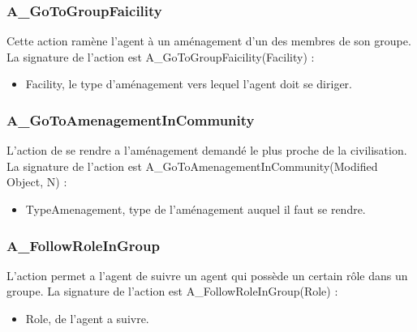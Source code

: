 	\subsubsection{A\_GoToGroupFaicility}

Cette action ramène l'agent à un aménagement d'un des membres de son groupe.
La signature de l'action est A\_GoToGroupFaicility(Facility) :
\begin{itemize}
\item Facility, le type d'aménagement vers lequel l'agent doit se diriger.
\end{itemize}

\subsubsection{A\_GoToAmenagementInCommunity}

L'action de se rendre a l'aménagement demandé le plus proche de la civilisation. 
La signature de l'action est A\_GoToAmenagementInCommunity(Modified Object, N) :
\begin{itemize}
\item TypeAmenagement, type de l'aménagement auquel il faut se rendre.
\end{itemize}

\subsubsection{A\_FollowRoleInGroup}

L'action permet a l'agent de suivre un agent qui possède un certain rôle dans un groupe.
La signature de l'action est A\_FollowRoleInGroup(Role) :
\begin{itemize}
\item Role, de l'agent a suivre.
\end{itemize}